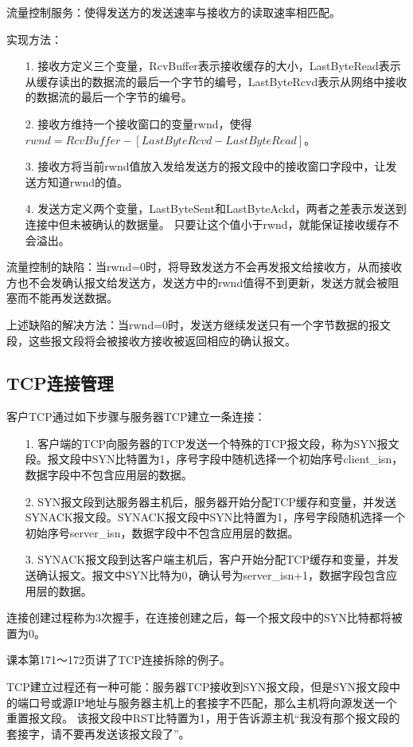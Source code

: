 \documentclass[a4paper,left=2.5cm,right=2.5cm,11pt]{article}
\begin{document}
	流量控制服务：使得发送方的发送速率与接收方的读取速率相匹配。\par

	实现方法：
	\begin{itemize}
		\item[1.] 接收方定义三个变量，RcvBuffer表示接收缓存的大小，LastByteRead表示从缓存读出的数据流的最后一个字节的编号，LastByteRcvd表示从网络中接收的数据流的最后一个字节的编号。
		\item[2.] 接收方维持一个接收窗口的变量rwnd，使得$rwnd=RcvBuffer-[LastByteRcvd - LastByteRead]$。
		\item[3.] 接收方将当前rwnd值放入发给发送方的报文段中的接收窗口字段中，让发送方知道rwnd的值。
		\item[4.] 发送方定义两个变量，LastByteSent和LastByteAckd，两者之差表示发送到连接中但未被确认的数据量。
			      只要让这个值小于rwnd，就能保证接收缓存不会溢出。
	\end{itemize}

	流量控制的缺陷：当rwnd=0时，将导致发送方不会再发报文给接收方，从而接收方也不会发确认报文给发送方，发送方中的rwnd值得不到更新，发送方就会被阻塞而不能再发送数据。\par

	上述缺陷的解决方法：当rwnd=0时，发送方继续发送只有一个字节数据的报文段，这些报文段将会被接收方接收被返回相应的确认报文。

\subsection{TCP连接管理}
	客户TCP通过如下步骤与服务器TCP建立一条连接：
	\begin{itemize}
		\item[1.] 客户端的TCP向服务器的TCP发送一个特殊的TCP报文段，称为SYN报文段。报文段中SYN比特置为1，序号字段中随机选择一个初始序号client\_isn，数据字段中不包含应用层的数据。
		\item[2.] SYN报文段到达服务器主机后，服务器开始分配TCP缓存和变量，并发送SYNACK报文段。SYNACK报文段中SYN比特置为1，序号字段随机选择一个初始序号server\_isn，数据字段中不包含应用层的数据。
		\item[3.] SYNACK报文段到达客户端主机后，客户开始分配TCP缓存和变量，并发送确认报文。报文中SYN比特为0，确认号为server\_isn+1，数据字段包含应用层的数据。
	\end{itemize}

	连接创建过程称为3次握手，在连接创建之后，每一个报文段中的SYN比特都将被置为0。\par

	课本第171～172页讲了TCP连接拆除的例子。\par

	TCP建立过程还有一种可能：服务器TCP接收到SYN报文段，但是SYN报文段中的端口号或源IP地址与服务器主机上的套接字不匹配，那么主机将向源发送一个重置报文段。
	该报文段中RST比特置为1，用于告诉源主机“我没有那个报文段的套接字，请不要再发送该报文段了”。
\end{document}
